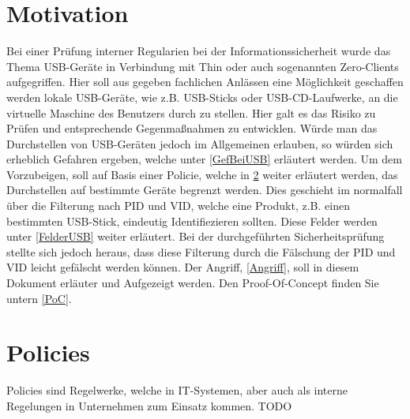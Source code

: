 \documentclass[a4paper,11pt,DIV=11,BROC=5mm,bigheadings,idxtotoc,cleardoubleempty,halfparskip,oneside,openright]{scrreprt} %
\begin{document}
			
						
				\cleardoublepage

			
				\cleardoublepage	
					
			\tableofcontents
				\cleardoublepage	
		
			\printnomenclature
				\cleardoublepage	
			
			\setcounter{page}{1}            
            \cleardoublepage
            
            
                \cleardoublepage
                
			\chapter{Motivation}
Bei einer Prüfung interner Regularien bei der Informationssicherheit wurde das Thema USB-Geräte in Verbindung mit Thin oder auch sogenannten Zero-Clients aufgegriffen. Hier soll aus gegeben fachlichen Anlässen eine Möglichkeit geschaffen werden lokale USB-Geräte, wie z.B. USB-Sticks oder USB-CD-Laufwerke, an die virtuelle Maschine des Benutzers durch zu stellen. Hier galt es das Risiko zu Prüfen und entsprechende Gegenmaßnahmen zu entwicklen. Würde man das Durchstellen von USB-Geräten jedoch im Allgemeinen erlauben, so würden sich erheblich Gefahren ergeben, welche unter \ref{GefBeiUSB} erläutert werden. Um dem Vorzubeigen, soll auf Basis einer Policie, welche in \ref{Policies} weiter erläutert werden, das Durchstellen auf bestimmte Geräte begrenzt werden. Dies geschieht im normalfall über die Filterung nach PID und VID, welche eine Produkt, z.B. einen bestimmten USB-Stick, eindeutig Identifiezieren sollten. Diese Felder werden unter \ref{FelderUSB} weiter erläutert. Bei der durchgeführten Sicherheitsprüfung stellte sich jedoch heraus, dass diese Filterung durch die Fälschung der PID und VID leicht gefälscht werden können. Der Angriff, \ref{Angriff}, soll in diesem Dokument erläuter und Aufgezeigt werden. Den Proof-Of-Concept finden Sie untern \ref{PoC}.

			
			
			
			\chapter{Policies} \label{Policies}
Policies sind Regelwerke, welche in IT-Systemen, aber auch als interne Regelungen in Unternehmen zum Einsatz kommen. TODO
\end{document}
